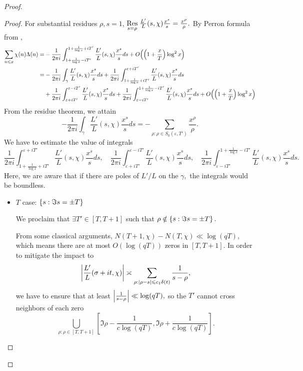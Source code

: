\begin{proof}
\begin{proof}
For substantial residues $\rho, s = 1$, $\underset{s = \rho}{\operatorname{Res}} \; \frac{L'}{L}(s, \chi) \frac{x^s}{s} = \frac{x^\rho}{\rho}.$ By Perron formula from \cite[Ch.~13]{Davenport}, 
\begin{align}
    \sum_{n \leqslant x} \chi(n)\Lambda(n) =& -\frac{1}{2 \pi i} \int_{1 + \frac{1}{\log x} - iT'}^{1 + \frac{1}{\log x} + iT'} \frac{L'}{L}(s, \chi) \frac{x^s}{s} ds + O\! \left( \left( 1+\frac{x}{T} \right) \log^2 x \right) \\
    =& -\frac{1}{2 \pi i} \int_\gamma \frac{L'}{L}(s, \chi) \frac{x^s}{s} ds + \frac{1}{2 \pi i} \int_{1 + \frac{1}{\log x} + iT'}^{\varepsilon + iT'} \frac{L'}{L}(s, \chi) \frac{x^s}{s} ds \\ 
    &+ \frac{1}{2 \pi i} \int_{\varepsilon + iT'}^{\varepsilon - iT'} \frac{L'}{L}(s, \chi) \frac{x^s}{s} ds + \frac{1}{2 \pi i} \int_{\varepsilon - iT'}^{1 + \frac{1}{\log x} - iT'} \frac{L'}{L}(s, \chi) \frac{x^s}{s} ds + O\! \left( \left( 1+\frac{x}{T} \right) \log^2 x \right)
\end{align}
From the residue theorem, we attain
\begin{equation*}
    -\frac{1}{2 \pi i} \int_\gamma \frac{L'}{L}(s, \chi) \frac{x^s}{s} ds = - \sum_{\rho: \rho \in S_0(\varepsilon, T')} \frac{x^\rho}{\rho}.
\end{equation*}
We have to estimate the value of integrals
$$\frac{1}{2 \pi i} \int_{1 + \frac{1}{\log x} + iT'}^{\varepsilon + iT'} \frac{L'}{L}(s, \chi) \frac{x^s}{s} ds, \quad \frac{1}{2 \pi i} \int_{\varepsilon + iT'}^{\varepsilon - iT'} \frac{L'}{L}(s, \chi) \frac{x^s}{s} ds, \quad \frac{1}{2 \pi i} \int_{\varepsilon - iT'}^{1 + \frac{1}{\log x} - iT'} \frac{L'}{L}(s, \chi) \frac{x^s}{s} ds.$$ Here, we are aware that if there are poles of $L'/L$ on the $\gamma,$ the integrals would be boundless.

\begin{itemize}
    \item $T$ case: $\left\{ s: \Im s = \pm T \right\}$

    We proclaim that $\exists T' \in [T, T+1]$ such that $\rho \notin \left\{ s: \Im s = \pm T \right\}.$ 

    From some classical arguments, $N(T+1, \chi) - N(T, \chi) \ll \log (qT),$ which means there are at most $O(\log (qT))$ zeros in $[T, T+1].$ In order to mitigate the impact to $$\left\lvert \frac{L'}{L}(\sigma + it, \chi) \right\rvert \asymp \sum_{\rho: |\rho - s| \leqslant c_1 \delta(t)} \frac{1}{{s - \rho}},$$ we have to ensure that at least $\left\lvert \frac{1}{s - \rho} \right\rvert \ll \log(qT),$ so the $T'$ cannot cross neighbors of each zero $$\bigcup_{\rho: \rho \in [T, T+1]} \left[ \Im \rho - \frac{1}{c \log(qT)}, \Im \rho + \frac{1}{c \log(qT)} \right].$$


\end{itemize}
\end{proof}
\end{proof}
